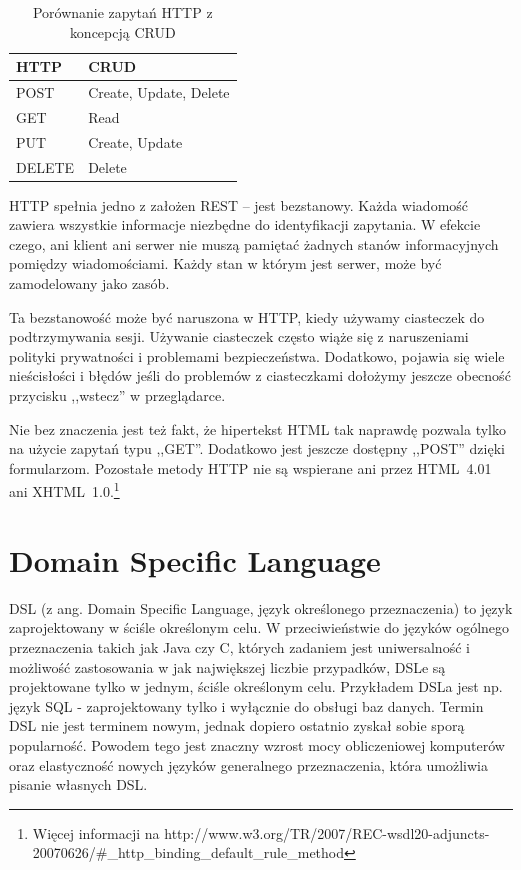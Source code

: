 \documentclass[a4paper,12pt,oneside]{report}
\begin{document}
\begin{table}[h]
  \begin{center}
    \begin{tabular}{|l|l|}\hline
    HTTP   & CRUD \\\hline
    POST   & Create, Update, Delete \\
    GET    & Read \\
    PUT    & Create, Update \\
    DELETE & Delete \\\hline
    \end{tabular}
  \caption{Porównanie zapytań HTTP z koncepcją CRUD\label{rest:crud}}
  \end{center}
\end{table}

HTTP spełnia jedno z założen REST -- jest bezstanowy. Każda wiadomość zawiera wszystkie informacje niezbędne do identyfikacji zapytania. W efekcie czego, ani klient ani serwer nie muszą pamiętać żadnych stanów informacyjnych pomiędzy wiadomościami. Każdy stan w którym jest serwer, może być zamodelowany jako zasób.

Ta bezstanowość może być naruszona w HTTP, kiedy używamy ciasteczek do podtrzymywania sesji. Używanie ciasteczek często wiąże się z naruszeniami polityki prywatności i problemami bezpieczeństwa. Dodatkowo, pojawia się wiele nieścisłości i błędów jeśli do problemów z ciasteczkami dołożymy jeszcze obecność przycisku ,,wstecz'' w przeglądarce.

Nie bez znaczenia jest też fakt, że hipertekst HTML tak naprawdę pozwala tylko na użycie zapytań typu ,,GET''. Dodatkowo jest jeszcze dostępny ,,POST'' dzięki formularzom. Pozostałe metody HTTP nie są wspierane ani przez HTML~4.01 ani XHTML~1.0.\footnote{Więcej informacji na http://www.w3.org/TR/2007/REC-wsdl20-adjuncts-20070626/\#\_http\_binding\_default\_rule\_method}

\section{Domain Specific Language}
\label{sec:dsl}
DSL (z ang. Domain Specific Language, język określonego przeznaczenia) to język zaprojektowany w ściśle określonym celu. W przeciwieństwie do języków ogólnego przeznaczenia takich jak Java czy C, których zadaniem jest uniwersalność i możliwość zastosowania w jak największej liczbie przypadków, DSLe są projektowane tylko w jednym, ściśle określonym celu. Przykładem DSLa jest np. język SQL - zaprojektowany tylko i wyłącznie do obsługi baz danych. Termin DSL nie jest terminem nowym, jednak dopiero ostatnio zyskał sobie sporą popularność. Powodem tego jest znaczny wzrost mocy obliczeniowej komputerów oraz elastyczność nowych języków generalnego przeznaczenia, która umożliwia pisanie własnych DSL.
\end{document}
